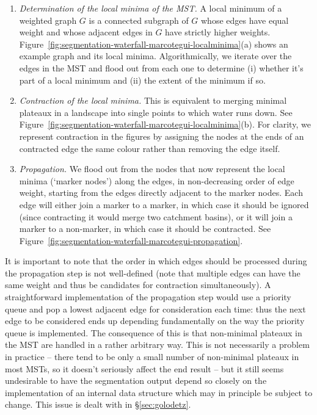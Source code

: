 \documentclass[preprint,a4paper]{elsarticle}
\begin{document}
\begin{enumerate}

\item \emph{Determination of the local minima of the MST.} A local minimum of a weighted graph $G$ is a connected subgraph of $G$ whose edges have equal weight and whose adjacent edges in $G$ have strictly higher weights. Figure~\ref{fig:segmentation-waterfall-marcotegui-localminima}(a) shows an example graph and its local minima. Algorithmically, we iterate over the edges in the MST and flood out from each one to determine (i) whether it's part of a local minimum and (ii) the extent of the minimum if so.

\item \emph{Contraction of the local minima.} This is equivalent to merging minimal plateaux in a landscape into single points to which water runs down. See Figure~\ref{fig:segmentation-waterfall-marcotegui-localminima}(b). For clarity, we represent contraction in the figures by assigning the nodes at the ends of an contracted edge the same colour rather than removing the edge itself.

\item \emph{Propagation.} We flood out from the nodes that now represent the local minima (`marker nodes') along the edges, in non-decreasing order of edge weight, starting from the edges directly adjacent to the marker nodes. Each edge will either join a marker to a marker, in which case it should be ignored (since contracting it would merge two catchment basins), or it will join a marker to a non-marker, in which case it should be contracted. See Figure~\ref{fig:segmentation-waterfall-marcotegui-propagation}.

\end{enumerate}

\noindent It is important to note that the order in which edges should be processed during the propagation step is not well-defined (note that multiple edges can have the same weight and thus be candidates for contraction simultaneously). A straightforward implementation of the propagation step would use a priority queue and pop a lowest adjacent edge for consideration each time: thus the next edge to be considered ends up depending fundamentally on the way the priority queue is implemented. The consequence of this is that non-minimal plateaux in the MST are handled in a rather arbitrary way. This is not necessarily a problem in practice -- there tend to be only a small number of non-minimal plateaux in most MSTs, so it doesn't seriously affect the end result -- but it still seems undesirable to have the segmentation output depend so closely on the implementation of an internal data structure which may in principle be subject to change. This issue is dealt with in \S\ref{sec:golodetz}.
\end{document}
